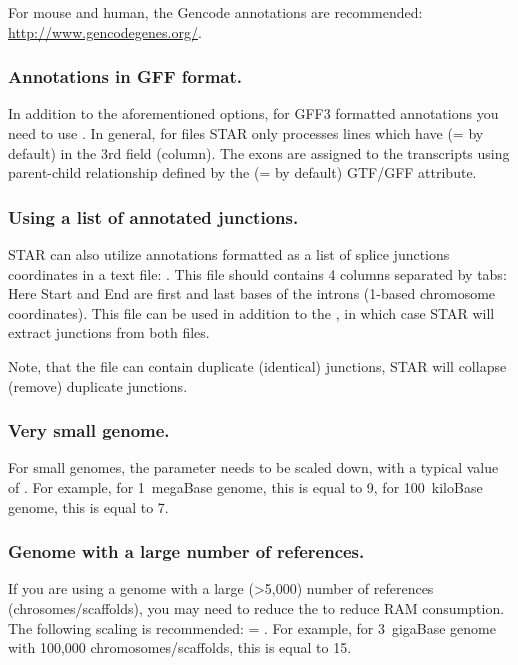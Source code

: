 \documentclass[12pt]{article}
\begin{document}
For mouse and human, the Gencode annotations are recommended: \url{http://www.gencodegenes.org/}.

\subsubsection{Annotations in GFF format.}
In addition to the aforementioned options, for GFF3 formatted annotations you need to use  . In general, for  files STAR only processes lines which have  (= by default) in the 3rd field (column). The exons are assigned to the transcripts using parent-child relationship defined by the  (= by default) GTF/GFF attribute.

\subsubsection{Using a list of annotated junctions.}
STAR can also utilize annotations formatted as a list of splice junctions coordinates in a text file:  . This file should contains 4 columns separated by tabs:
Here Start and End are first and last bases of the introns (1-based chromosome coordinates).
This file can be used in addition to the , in which case STAR will extract junctions from both files.

Note, that the  file can contain duplicate (identical) junctions, STAR will collapse (remove) duplicate junctions.

\subsubsection{Very small genome.}
For small genomes, the parameter  needs to be scaled down, with a typical value of . For example, for 1~megaBase genome, this is equal to 9, for 100~kiloBase genome, this is equal to 7.

\subsubsection{Genome with a large number of references.}
If you are using a genome with a large (\textgreater 5,000) number of references (chrosomes/scaffolds), you may need to reduce the  to reduce RAM consumption. The following scaling is recommended:  = . For example, for 3~gigaBase genome with 100,000 chromosomes/scaffolds, this is equal to 15.
\end{document}
